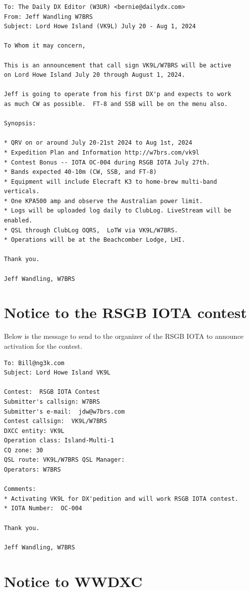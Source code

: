 \documentclass[11pt]{article}
\begin{document}
\begin{Verbatim}[fontsize=\small]
To: The Daily DX Editor (W3UR) <bernie@dailydx.com>
From: Jeff Wandling W7BRS
Subject: Lord Howe Island (VK9L) July 20 - Aug 1, 2024

To Whom it may concern,

This is an announcement that call sign VK9L/W7BRS will be active
on Lord Howe Island July 20 through August 1, 2024.

Jeff is going to operate from his first DX'p and expects to work
as much CW as possible.  FT-8 and SSB will be on the menu also.

Synopsis:

* QRV on or around July 20-21st 2024 to Aug 1st, 2024
* Expedition Plan and Information http://w7brs.com/vk9l
* Contest Bonus -- IOTA OC-004 during RSGB IOTA July 27th.
* Bands expected 40-10m (CW, SSB, and FT-8)
* Equipment will include Elecraft K3 to home-brew multi-band verticals.
* One KPA500 amp and observe the Australian power limit.
* Logs will be uploaded log daily to ClubLog. LiveStream will be enabled.
* QSL through ClubLog OQRS,  LoTW via VK9L/W7BRS.
* Operations will be at the Beachcomber Lodge, LHI.

Thank you.

Jeff Wandling, W7BRS
\end{Verbatim}

\section{Notice to the RSGB IOTA contest}

Below is the message to send to the organizer of the RSGB IOTA to
announce activation for the contest.

\begin{Verbatim}[fontsize=\small]
To: Bill@ng3k.com
Subject: Lord Howe Island VK9L

Contest:  RSGB IOTA Contest
Submitter's callsign: W7BRS
Submitter's e-mail:  jdw@w7brs.com
Contest callsign:  VK9L/W7BRS
DXCC entity: VK9L
Operation class: Island-Multi-1
CQ zone: 30
QSL route: VK9L/W7BRS QSL Manager:
Operators: W7BRS

Comments: 
* Activating VK9L for DX'pedition and will work RSGB IOTA contest.
* IOTA Number:  OC-004

Thank you.

Jeff Wandling, W7BRS
\end{Verbatim}

\section{Notice to WWDXC}
\end{document}
